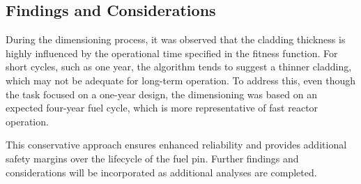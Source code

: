 \subsection{Findings and Considerations}

During the dimensioning process, it was observed that the cladding thickness is highly influenced by the operational time specified in the fitness function. For short cycles, such as one year, the algorithm tends to suggest a thinner cladding, which may not be adequate for long-term operation. To address this, even though the task focused on a one-year design, the dimensioning was based on an expected four-year fuel cycle, which is more representative of fast reactor operation.

This conservative approach ensures enhanced reliability and provides additional safety margins over the lifecycle of the fuel pin. Further findings and considerations will be incorporated as additional analyses are completed.
